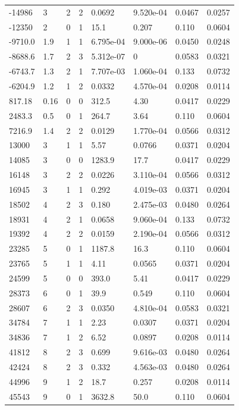 \documentclass[preview]{standalone}
\begin{document}
{{\begin{tabular}{L{1.2cm}C{1.2cm} C{0.3cm}C{0.5cm} C{1.4cm}C{1.4cm} C{1.4cm}C{1.4cm}}
  -14986  &     3  & 2     &  2 &  0.0692  & 9.520e-04  & 0.0467 &  0.0257   \\ 
  -12350  &     2  & 0     &  1 &  15.1  & 0.207  & 0.110 &  0.0604   \\ 
  -9710.0  &   1.9  & 1     &  1 &  6.795e-04  & 9.000e-06  & 0.0450 &  0.0248   \\ 
  -8688.6  &   1.7  & 2     &  3 &  5.312e-07  & 0  & 0.0583 &  0.0321   \\ 
  -6743.7  &   1.3  & 2     &  1 &  7.707e-03  & 1.060e-04  & 0.133 &  0.0732   \\ 
  -6204.9  &   1.2  & 1     &  2 &  0.0332  & 4.570e-04  & 0.0208 &  0.0114   \\ 
  817.18  &  0.16  & 0     &  0 &  312.5  & 4.30  & 0.0417 &  0.0229   \\ 
  2483.3  &   0.5  & 0     &  1 &  264.7  & 3.64  & 0.110 &  0.0604   \\ 
  7216.9  &   1.4  & 2     &  2 &  0.0129  & 1.770e-04  & 0.0566 &  0.0312   \\ 
  13000  &     3  & 1     &  1 &  5.57  & 0.0766  & 0.0371 &  0.0204   \\ 
  14085  &     3  & 0     &  0 &  1283.9  & 17.7  & 0.0417 &  0.0229   \\ 
  16148  &     3  & 2     &  2 &  0.0226  & 3.110e-04  & 0.0566 &  0.0312   \\ 
  16945  &     3  & 1     &  1 &  0.292  & 4.019e-03  & 0.0371 &  0.0204   \\ 
  18502  &     4  & 2     &  3 &  0.180  & 2.475e-03  & 0.0480 &  0.0264   \\ 
  18931  &     4  & 2     &  1 &  0.0658  & 9.060e-04  & 0.133 &  0.0732   \\ 
  19392  &     4  & 2     &  2 &  0.0159  & 2.190e-04  & 0.0566 &  0.0312   \\ 
  23285  &     5  & 0     &  1 &  1187.8  & 16.3  & 0.110 &  0.0604   \\ 
  23765  &     5  & 1     &  1 &  4.11  & 0.0565  & 0.0371 &  0.0204   \\ 
  24599  &     5  & 0     &  0 &  393.0  & 5.41  & 0.0417 &  0.0229   \\ 
  28373  &     6  & 0     &  1 &  39.9  & 0.549  & 0.110 &  0.0604   \\ 
  28607  &     6  & 2     &  3 &  0.0350  & 4.810e-04  & 0.0583 &  0.0321   \\ 
  34784  &     7  & 1     &  1 &  2.23  & 0.0307  & 0.0371 &  0.0204   \\ 
  34836  &     7  & 1     &  2 &  6.52  & 0.0897  & 0.0208 &  0.0114   \\ 
  41812  &     8  & 2     &  3 &  0.699  & 9.616e-03  & 0.0480 &  0.0264   \\ 
  42424  &     8  & 2     &  3 &  0.332  & 4.563e-03  & 0.0480 &  0.0264   \\ 
  44996  &     9  & 1     &  2 &  18.7  & 0.257  & 0.0208 &  0.0114   \\ 
  45543  &     9  & 0     &  1 &  3632.8  & 50.0  & 0.110 &  0.0604   \\ 
\hline 
\end{tabular} 

}}
\end{document}
